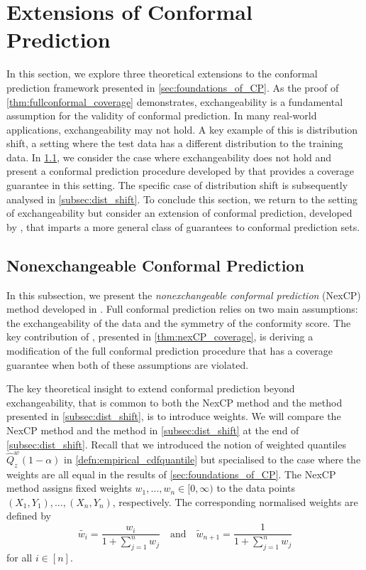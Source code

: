 \documentclass[11pt, titlepage]{article} %
\numberwithin{equation}{section}
\theoremstyle{definition}
\numberwithin{theorem}{section}
\numberwithin{lemma}{section}
\numberwithin{corollary}{section}
\numberwithin{proposition}{section}
\numberwithin{definition}{section}
\numberwithin{remark}{section}
\begin{document}
\section{Extensions of Conformal Prediction}
\label{sec:extensions_of_CP}

In this section, we explore three theoretical extensions to the conformal prediction framework presented in \cref{sec:foundations_of_CP}. As the proof of \cref{thm:fullconformal_coverage} demonstrates, exchangeability is a fundamental assumption for the validity of conformal prediction. In many real-world applications, exchangeability may not hold. A key example of this is distribution shift, a setting where the test data has a different distribution to the training data. In \cref{subsec:nex_CP}, we consider the case where exchangeability does not hold and present a conformal prediction procedure developed by \cite{barber2023conformalbeyondexch} that provides a coverage guarantee in this setting. The specific case of distribution shift is subsequently analysed in \cref{subsec:dist_shift}. To conclude this section, we return to the setting of exchangeability but consider an extension of conformal prediction, developed by \cite{angelopoulos2024riskcontrol}, that imparts a more general class of guarantees to conformal prediction sets.

\subsection{Nonexchangeable Conformal Prediction}
\label{subsec:nex_CP}



In this subsection, we present the \textit{nonexchangeable conformal prediction} (NexCP) method developed in \cite{barber2023conformalbeyondexch}. Full conformal prediction relies on two main assumptions: the exchangeability of the data and the symmetry of the conformity score. The key contribution of \cite{barber2023conformalbeyondexch}, presented in \cref{thm:nexCP_coverage}, is deriving a modification of the full conformal prediction procedure that has a coverage guarantee when both of these assumptions are violated. \vskip5pt

\noindent
The key theoretical insight to extend conformal prediction beyond exchangeability, that is common to both the NexCP method and the method presented in \cref{subsec:dist_shift}, is to introduce weights. We will compare the NexCP method and the method in \cref{subsec:dist_shift} at the end of \cref{subsec:dist_shift}.  Recall that we introduced the notion of weighted quantiles \(\hat{Q}_z^w(1-\alpha)\) in \cref{defn:empirical_cdfquantile} but specialised to the case where the weights are all equal in the results of \cref{sec:foundations_of_CP}. The NexCP method assigns fixed weights \(w_1, \ldots, w_{n} \in [0, \infty)\) to the data points \((X_1, Y_1), \ldots, (X_n, Y_n)\), respectively. The corresponding normalised weights are defined by \begin{equation}
    \tilde{w_i} = \frac{w_i}{1+\sum_{j=1}^n w_j} \quad \mathrm{and} \quad \tilde{w}_{n+1} = \frac{1}{1+\sum_{j=1}^n w_j}
\label{eqn:nexCP_weights_defn}
\end{equation} for all \(i \in [n]\). \vskip5pt
\end{document}
